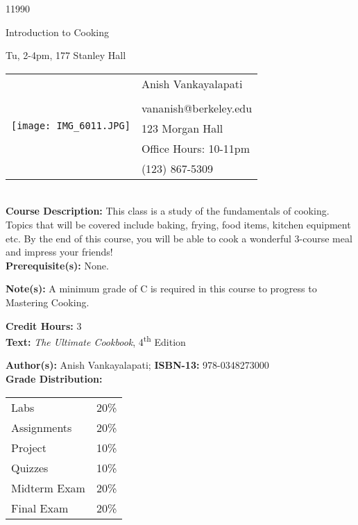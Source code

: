 \documentclass[11pt]{article}
\begin{document}
\LARGE 11990

\LARGE Introduction to Cooking

\LARGE Tu, 2-4pm, 177 Stanley Hall

\vspace{10mm}

\begin{tabular}{ l l }
  \multirow{6}{*}{\texttt{[image: IMG\_6011.JPG]}} & \large Anish Vankayalapati \\\\
  & \large vananish@berkeley.edu \\
  & \large 123 Morgan Hall \\
  & \large Office Hours: 10-11pm \\
  & \large (123) 867-5309 \\
\end{tabular}
\vspace{10mm}
\\

\textbf {Course Description:} This class is a study of the fundamentals of cooking. Topics that will be covered include baking, frying, food items, kitchen equipment etc. By the end of this course, you will be able to cook a wonderful 3-course meal and impress your friends! \\
\textbf {Prerequisite(s):} None.

\textbf {Note(s):} A minimum grade of C is required in this course to progress to Mastering Cooking. 

\textbf {Credit Hours:} 3 \\

\textbf {Text:} \emph{The Ultimate Cookbook}, 4\textsuperscript{th} Edition

\textbf {Author(s):} Anish Vankayalapati;  \textbf {ISBN-13:} 978-0348273000 \\


\textbf {Grade Distribution:} \\
\hspace*{40mm}
\begin{tabular}{ l l }
Labs & 20\% \\
Assignments & 20\% \\
Project & 10\% \\
Quizzes  & 10\% \\
Midterm Exam  & 20\% \\
Final Exam  & 20\%
\end{tabular} \\\\
\end{document}
